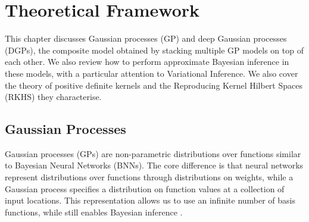 \ifpdf
    \graphicspath{{Chapter2/Figs/Vector/}{Chapter2/Figs/PDF/}{Chapter2/Figs/}}
\else
    \graphicspath{{Chapter2/Figs/Raster/}{Chapter2/Figs/}}
\fi


\chapter{Theoretical Framework}
\label{chapter:theoretical-framework}

This chapter discusses Gaussian processes (GP) and deep Gaussian processes (DGPs), the composite model obtained by stacking multiple GP models on top of each other. We also review how to perform approximate Bayesian inference in these models, with a particular attention to Variational Inference. We also cover the theory of positive definite kernels and the Reproducing Kernel Hilbert Spaces (RKHS) they characterise.

\section{Gaussian Processes}
\label{sec:chapter1:gp}


Gaussian processes (GPs) \citep{rasmussen2006} are non-parametric distributions over functions similar to Bayesian Neural Networks (BNNs). The core difference is that neural networks represent distributions over functions through distributions on weights, while a Gaussian process specifies a distribution on function values at a collection of input locations. This representation allows us to use an infinite number of basis functions, while still enables Bayesian inference \citep{neal1996bayesian}. 

